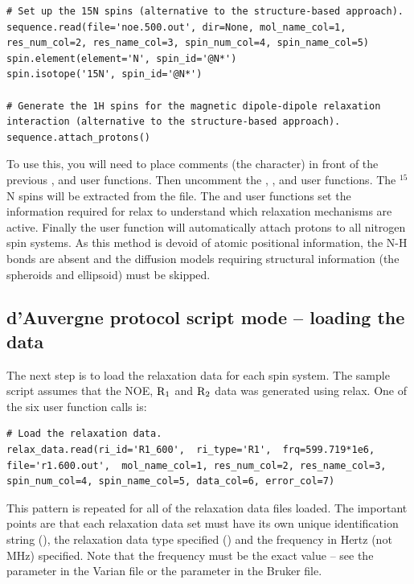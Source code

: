 \begin{htmlonly}
\begin{htmlonly}
\begin{lstlisting}[firstnumber=172]
# Set up the 15N spins (alternative to the structure-based approach).
sequence.read(file='noe.500.out', dir=None, mol_name_col=1, res_num_col=2, res_name_col=3, spin_num_col=4, spin_name_col=5)
spin.element(element='N', spin_id='@N*')
spin.isotope('15N', spin_id='@N*')

# Generate the 1H spins for the magnetic dipole-dipole relaxation interaction (alternative to the structure-based approach).
sequence.attach_protons()
\end{lstlisting}

To use this, you will need to place comments (the \pycode{\#} character) in front of the previous ,  and  user functions.
Then uncomment the , ,  and  user functions.
The $^{15}$N spins will be extracted from the  file.
The  and  user functions set the information required for relax to understand which relaxation mechanisms are active.
Finally the  user function will automatically attach protons to all nitrogen spin systems.
As this method is devoid of atomic positional information, the N-H bonds are absent and the diffusion models requiring structural information (the spheroids and ellipsoid) must be skipped.



\subsection{d'Auvergne protocol script mode -- loading the data}

The next step is to load the relaxation data for each spin system.
The sample script assumes that the NOE, $\mathrm{R}_1$ and $\mathrm{R}_2$ data was generated using relax.
One of the six user function calls is:

\begin{lstlisting}[firstnumber=180]
# Load the relaxation data.
relax_data.read(ri_id='R1_600',  ri_type='R1',  frq=599.719*1e6, file='r1.600.out',  mol_name_col=1, res_num_col=2, res_name_col=3, spin_num_col=4, spin_name_col=5, data_col=6, error_col=7)
\end{lstlisting}

This pattern is repeated for all of the relaxation data files loaded.
The important points are that each relaxation data set must have its own unique identification string (), the relaxation data type specified () and the frequency in Hertz (not MHz) specified.
Note that the frequency must be the exact value -- see the  parameter in the Varian  file or the  parameter in the Bruker  file.



\end{htmlonly}
\end{htmlonly}
